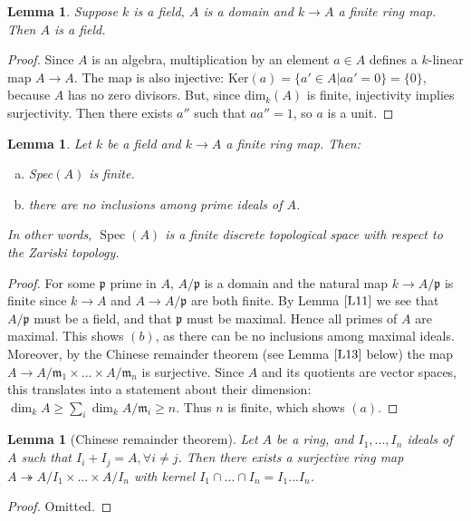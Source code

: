 \documentclass{article}
\newcommand{\fr}{\mathfrak}
\DeclareMathOperator{\Spec}{Spec}
\theoremstyle{plain}
\newtheorem{lem}[thm]{Lemma}
\theoremstyle{definition}
\theoremstyle{remark}
\begin{document}
\begin{lem}
\label{L11}
Suppose $k$ is a field, $A$ is a domain and $k \to A$ a finite ring map. Then $A$ is a field.
\end{lem}
\begin{proof}
Since $A$ is an algebra, multiplication by an element $a\in A$ defines a $k$-linear map $A\to A$. The map is also injective: Ker$(a) = \{ a' \in A | aa' = 0 \} = \{ 0 \}$, because $A$ has no zero divisors. But, since dim$_k (A)$ is finite, injectivity implies surjectivity. Then there exists $a''$ such that $aa'' = 1$, so $a$ is a unit.
\end{proof}

\begin{lem}
\label{L12}
Let $k$ be a field and $k\to A$ a finite ring map. Then:
\begin{enumerate}[(a)]
\item Spec$(A)$ is finite.
\item there are no inclusions among prime ideals of $A$.
\end{enumerate}
In other words, $\Spec(A)$ is a finite discrete topological space with respect to the Zariski topology.
\end{lem}
\begin{proof}
For some $\fr p$ prime in $A$, $A/\fr p$ is a domain and the natural map $k\to A/\fr p$ is finite since $k\to A$ and $A\to A/\fr p$ are both finite. 
By Lemma $\ref{L11}$ we see that $A/\fr p$ must be a field, and that $\fr p$ must be maximal. Hence all primes of $A$ are maximal. This shows $(b)$, as there can be no inclusions among maximal ideals. Moreover, by the Chinese remainder theorem (see Lemma $\ref{L13}$ below) the map $A \to A/\fr m_1 \times \ldots \times A/\fr m_n$ is surjective.
Since $A$ and its quotients are vector spaces, this translates into a statement about their dimension: $\dim_k A \geq \sum_i \dim_k A/\fr m_i \geq n$. Thus $n$ is finite, which shows $(a)$.
\end{proof}

\begin{lem} [Chinese remainder theorem]
\label{L13}
Let $A$ be a ring, and $I_1, ... , I_n$ ideals of $A$ such that $I_i + I_j = A , \forall i\neq j$. Then there exists a surjective ring map $A \twoheadrightarrow A/I_1 \times ... \times A/I_n$ with kernel $I_1 \cap ... \cap I_n = I_1 ... I_n$.
\end{lem}
\begin{proof}
Omitted.
\end{proof}
\end{document}
